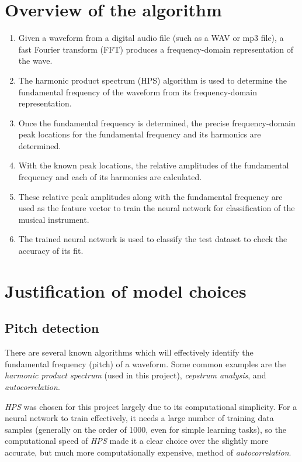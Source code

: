 \documentclass[12pt]{article}
\begin{document}
\section{Overview of the algorithm}
\begin{enumerate}
	\item Given a waveform from a digital audio file (such as a WAV or mp3 file), a fast Fourier transform (FFT) produces a frequency-domain representation of the wave.
	\item The harmonic product spectrum (HPS) algorithm is used to determine the fundamental frequency of the waveform from its frequency-domain representation.
	\item Once the fundamental frequency is determined, the precise frequency-domain peak locations for the fundamental frequency and its harmonics are determined.
	\item With the known peak locations, the relative amplitudes of the fundamental frequency and each of its harmonics are calculated.
	\item These relative peak amplitudes along with the fundamental frequency are used as the feature vector to train the neural network for classification of the musical instrument.
	\item The trained neural network is used to classify the test dataset to check the accuracy of its fit.
\end{enumerate}

\section{Justification of model choices}
\subsection{Pitch detection}
	There are several known algorithms which will effectively identify the fundamental frequency (pitch) of a waveform. Some common examples are the \textit{harmonic product spectrum} (used in this project), \textit{cepstrum analysis}, and \textit{autocorrelation}.
	
	\textit{HPS} was chosen for this project largely due to its computational simplicity. For a neural network to train effectively, it needs a large number of training data samples (generally on the order of 1000, even for simple learning tasks), so the computational speed of \textit{HPS} made it a clear choice over the slightly more accurate, but much more computationally expensive, method of \textit{autocorrelation}.
	
\end{document}
